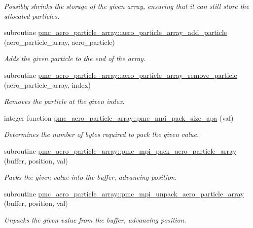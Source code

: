 \begin{DoxyCompactItemize}
\begin{DoxyCompactList}\small\item\em Possibly shrinks the storage of the given array, ensuring that it can still store the allocated particles. \end{DoxyCompactList}\item 
subroutine \mbox{\hyperlink{namespacepmc__aero__particle__array_ab73b42afceadd849d5ec2764a00f352b}{pmc\+\_\+aero\+\_\+particle\+\_\+array\+::aero\+\_\+particle\+\_\+array\+\_\+add\+\_\+particle}} (aero\+\_\+particle\+\_\+array, aero\+\_\+particle)
\begin{DoxyCompactList}\small\item\em Adds the given particle to the end of the array. \end{DoxyCompactList}\item 
subroutine \mbox{\hyperlink{namespacepmc__aero__particle__array_ae9235097ccd6e404376698476935f1d8}{pmc\+\_\+aero\+\_\+particle\+\_\+array\+::aero\+\_\+particle\+\_\+array\+\_\+remove\+\_\+particle}} (aero\+\_\+particle\+\_\+array, index)
\begin{DoxyCompactList}\small\item\em Removes the particle at the given index. \end{DoxyCompactList}\item 
integer function \mbox{\hyperlink{namespacepmc__aero__particle__array_a290d3188932591b977cef41dd912a335}{pmc\+\_\+aero\+\_\+particle\+\_\+array\+::pmc\+\_\+mpi\+\_\+pack\+\_\+size\+\_\+apa}} (val)
\begin{DoxyCompactList}\small\item\em Determines the number of bytes required to pack the given value. \end{DoxyCompactList}\item 
subroutine \mbox{\hyperlink{namespacepmc__aero__particle__array_a5a1cb513ef2be5a52af19464a8a17a3f}{pmc\+\_\+aero\+\_\+particle\+\_\+array\+::pmc\+\_\+mpi\+\_\+pack\+\_\+aero\+\_\+particle\+\_\+array}} (buffer, position, val)
\begin{DoxyCompactList}\small\item\em Packs the given value into the buffer, advancing position. \end{DoxyCompactList}\item 
subroutine \mbox{\hyperlink{namespacepmc__aero__particle__array_a291741b0c1a43833d01c1e90fce5848b}{pmc\+\_\+aero\+\_\+particle\+\_\+array\+::pmc\+\_\+mpi\+\_\+unpack\+\_\+aero\+\_\+particle\+\_\+array}} (buffer, position, val)
\begin{DoxyCompactList}\small\item\em Unpacks the given value from the buffer, advancing position. \end{DoxyCompactList}\item 

\end{DoxyCompactItemize}
